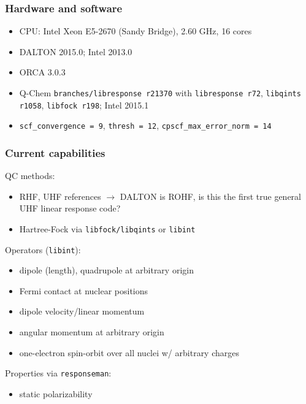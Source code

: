 \documentclass[xcolor=usenames,dvipsnames,svgnames]{beamer}
\begin{document}
\begin{frame}
  \frametitle{Hardware and software}
  \begin{itemize}
  \item CPU: Intel Xeon E5-2670 (Sandy Bridge), 2.60 GHz, 16 cores
  \item DALTON 2015.0; Intel 2013.0
  \item ORCA 3.0.3
  \item Q-Chem \texttt{branches/libresponse r21370} with \texttt{libresponse r72}, \texttt{libqints r1058}, \texttt{libfock r198}; Intel 2015.1
  \item \texttt{scf\_convergence = 9}, \texttt{thresh = 12}, \texttt{cpscf\_max\_error\_norm = 14}
  \end{itemize}
\end{frame}

\begin{frame}
  \frametitle{Current capabilities}
  QC methods:
  \begin{itemize}
  \item RHF, UHF references \(\rightarrow\) DALTON is ROHF, is this the first true general UHF linear response code?
  \item Hartree-Fock via \texttt{libfock/libqints} or \texttt{libint}
  \end{itemize}
  Operators (\texttt{libint}):
  \begin{itemize}
  \item dipole (length), quadrupole at arbitrary origin
  \item Fermi contact at nuclear positions
  \item dipole velocity/linear momentum
  \item angular momentum at arbitrary origin
  \item one-electron spin-orbit over all nuclei w/ arbitrary charges
  \end{itemize}
  Properties via \texttt{responseman}:
  \begin{itemize}
  \item static polarizability
  \end{itemize}
\end{frame}
\end{document}
